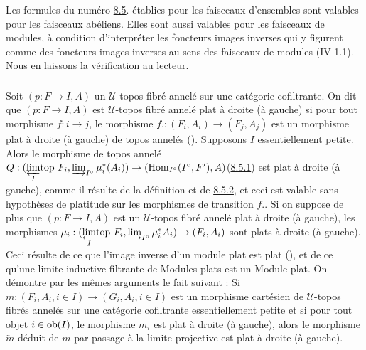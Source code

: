 \documentclass[10pt]{../fichiers-configuration-latex/smfart}
\begin{document}
\subsubsection{}

Les formules du numéro \hyperref[VI.subsec8.5]{8.5}. établies pour les
faisceaux d'ensembles sont valables pour les faisceaux abéliens.
Elles sont aussi valables pour les faisceaux de modules, à condition
d'interpréter les foncteurs images inverses qui y figurent comme des
foncteurs images inverses au sens des faisceaux de modules (IV 1.1).
Nous en laissons la vérification au lecteur.

\subsubsection{}

Soit $(p : F \to I, A)$ un $𝒰$-topos fibré annelé sur une catégorie
cofiltrante. On dit que $(p : F \to I, A)$ est $𝒰$-topos fibré annelé
plat à droite (\resp à gauche) si pour tout morphisme $f : i \to j$,
le morphisme $f. : (F_i, A_i) \to (F_j, A_j)$ est un morphisme plat à
droite (\resp à gauche) de topos annelés (). Supposons $I$
essentiellement petite. Alors le morphisme de topos annelé
 $Q : (\limtop{I} F_i,
\varinjlim_{I^{\circ}} \mu^{\ast}_i (A_i)) \to (\Hom_{I^{\circ}}
(I^{\circ}, F'), A)$\pageoriginale (\hyperref[VI.subsubsec8.5.1]{8.5.1}) est
plat à droite (\resp à gauche), comme il résulte de la définition et
de \hyperref[VI.prop8.5.2]{8.5.2}, et ceci est valable sans hypothèses de
platitude sur les morphismes de transition $f.$. Si on suppose de
plus que $(p : F \to I, A)$ est un $𝒰$-topos fibré annelé
plat à droite (\resp à gauche), les morphismes $\mu_i : (\limtop{I}
F_i, \varinjlim_{I^{\circ}} \mu^{\ast}_i A_i) \to (F_i, A_i)$ sont
plats à droite (\resp à gauche). Ceci résulte de ce que l'image
inverse d'un module plat est plat (), et de ce
qu'une limite inductive filtrante de Modules plats est un Module
plat. On démontre par les mêmes arguments le fait suivant : Si $m :
(F_i, A_i, i \in I) \to (G_i, A_i, i \in I)$ est un morphisme
cartésien de $𝒰$-topos fibrés annelés sur une catégorie
cofiltrante essentiellement petite et si pour tout objet $i \in \operatorname{ob}
(I)$, le morphisme $m_i$ est plat à droite (\resp à gauche), alors
le morphisme $\underleftarrow{m}$ déduit de $m$ par passage à la
limite projective est plat à droite (\resp à gauche).
\end{document}
